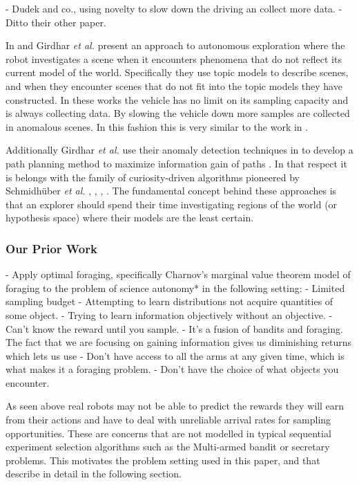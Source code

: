 	- Dudek and co., using novelty to slow down the driving an collect more data.
		- Ditto their other paper.

In \cite{gridhar2013autonomous} and \cite{girdhar2013Aautonomous} Girdhar
\emph{et al.} present an approach to autonomous exploration where the robot
investigates a scene when it encounters phenomena that do not reflect its
current model of the world.  Specifically they use topic models to describe
scenes, and when they encounter scenes that do not fit into the topic models
they have constructed.  In these works the vehicle has no limit on its sampling
capacity and is always collecting data.  By slowing the vehicle down more
samples are collected in anomalous scenes.  In this fashion this is very
similar to the work in \cite{thompson2013adaptive}.

Additionally Girdhar \emph{et al.} use their anomaly detection techniques in
\cite{girdhar2013autonomous} to develop a path planning method to maximize
information gain of paths \cite{girdhar2014curiosity}.  In that respect it is
belongs with the family of curiosity-driven algorithms pioneered by
Schmidh{\"u}ber \emph{et al.} \cite{schmidhuber1997what},
\cite{schmidhuber2003exploring}, \cite{schmidhuber2009simple},
\cite{sun2011planning}.  The fundamental concept behind these approaches is
that an explorer should spend their time investigating regions of the world (or
hypothesis space) where their models are the least certain.

\subsubsection{Our Prior Work}
		- Apply optimal foraging, specifically Charnov's marginal value theorem
		model of foraging to the problem of science autonomy* in the following setting:	
			- Limited sampling budget
			- Attempting to learn distributions not acquire quantities of some object.
			- Trying to learn information objectively without an objective. 
			- Can't know the reward until you sample.
			- It's a fusion of bandits and foraging.  The fact that we are focusing on gaining information gives us diminishing returns which lets us use 
			- Don't have access to all the arms at any given time, which is what makes it a foraging problem.
			- Don't have the choice of what objects you encounter.

As seen above real robots may not be able to predict the rewards they will earn from their actions and have to deal with unreliable arrival rates for sampling opportunities.  These are concerns that are not modelled in typical sequential experiment selection algorithms such as the Multi-armed bandit or secretary problems.  This motivates the problem setting used in this paper, and that describe in detail in the following section.

